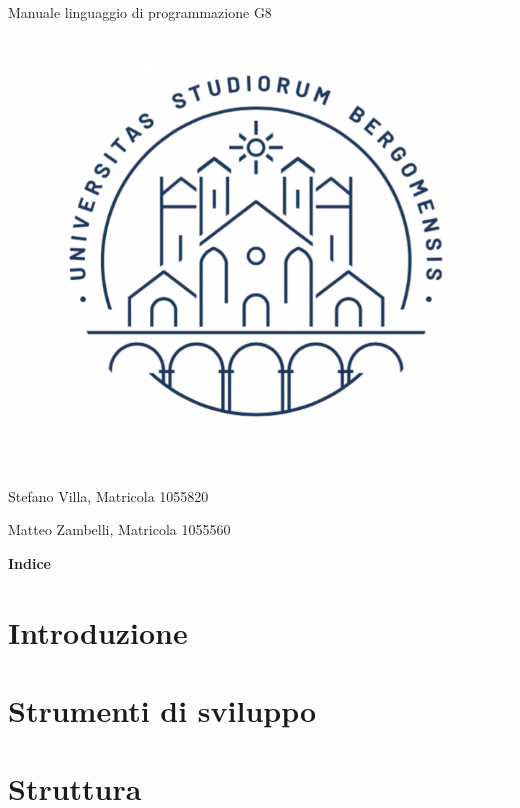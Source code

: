 \documentclass[a4paper]{article}
\begin{document}
\begin{center}
\begin{Huge}
Manuale linguaggio di programmazione G8
\end{Huge}
\end{center}

\includegraphics[scale=1]{UniBG.png}
\\
\\
\begin{Large}
\begin{flushright}
Stefano Villa, Matricola 1055820

Matteo Zambelli, Matricola 1055560
\end{flushright}
\end{Large}

\newpage
\begin{LARGE}
\textbf{Indice}
\end{LARGE}

\newpage

\section{Introduzione}

\newpage

\section{Strumenti di sviluppo}

\newpage

\section{Struttura}
\end{document}
